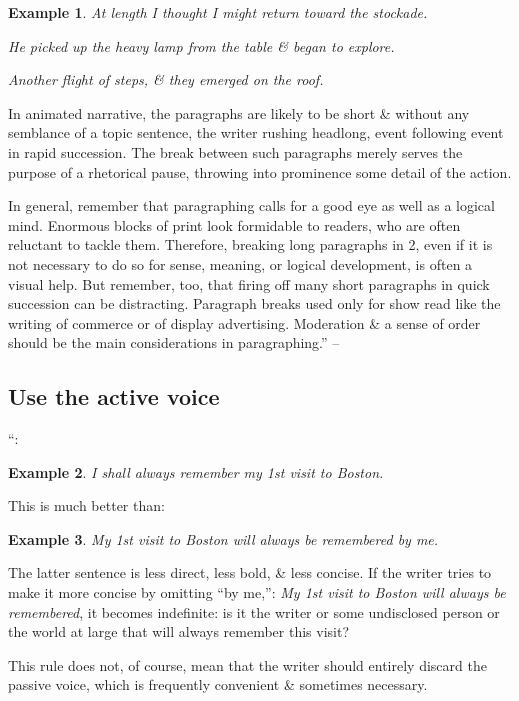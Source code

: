 \documentclass[oneside]{book}
\numberwithin{equation}{section}
\newtheorem{example}{Example}[chapter]
\begin{document}
\begin{example}
	At length I thought I might return toward the stockade.
	
	He picked up the heavy lamp from the table \& began to explore.
	
	Another flight of steps, \& they emerged on the roof.
\end{example}
In animated narrative, the paragraphs are likely to be short \& without any semblance of a topic sentence, the writer rushing headlong, event following event in rapid succession. The break between such paragraphs merely serves the purpose of a rhetorical pause, throwing into prominence some detail of the action.

In general, remember that paragraphing calls for a good eye as well as a logical mind. Enormous blocks of print look formidable to readers, who are often reluctant to tackle them. Therefore, breaking long paragraphs in 2, even if it is not necessary to do so for sense, meaning, or logical development, is often a visual help. But remember, too, that firing off many short paragraphs in quick succession can be distracting. Paragraph breaks used only for show read like the writing of commerce or of display advertising. Moderation \& a sense of order should be the main considerations in paragraphing.'' --  \cite[Chap. 2, Sect. 13, pp. 30--31]{Strunk_White2019}

\subsection{Use the active voice}
``:

\begin{example}
	I shall always remember my 1st visit to Boston.
\end{example}
This is much better than:

\begin{example}
	My 1st visit to Boston will always be remembered by me.
\end{example}
The latter sentence is less direct, less bold, \& less concise. If the writer tries to make it more concise by omitting ``by me,'': \textit{My 1st visit to Boston will always be remembered}, it becomes indefinite: is it the writer or some undisclosed person or the world at large that will always remember this visit?

This rule does not, of course, mean that the writer should entirely discard the passive voice, which is frequently convenient \& sometimes necessary.
\end{document}
